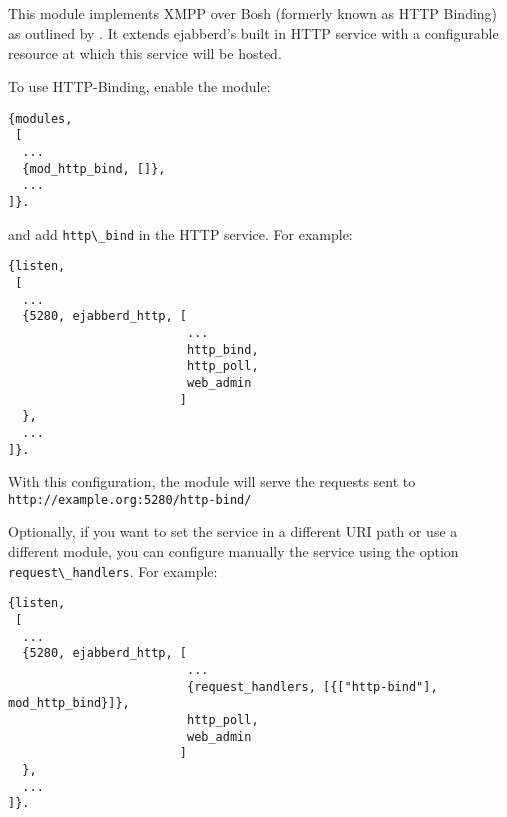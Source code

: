 \subsection{\modhttpbind{}}
\label{modhttpbind}

This module implements XMPP over Bosh (formerly known as HTTP Binding)
as outlined by .
It extends ejabberd's built in HTTP service with a configurable
resource at which this service will be hosted.

To use HTTP-Binding, enable the module:
\begin{verbatim}
{modules,
 [
  ...
  {mod_http_bind, []},
  ...
]}.
\end{verbatim}
and add \verb|http\_bind| in the HTTP service. For example:
\begin{verbatim}
{listen, 
 [
  ...
  {5280, ejabberd_http, [
                         ...
                         http_bind,
                         http_poll,
                         web_admin
                        ]
  },
  ...
]}.
\end{verbatim}
With this configuration, the module will serve the requests sent to 
\verb|http://example.org:5280/http-bind/|

Optionally, if you want to set the service in a different URI path or use a different module, 
you can configure manually the service using the option \verb|request\_handlers|. 
For example:
\begin{verbatim}
{listen, 
 [
  ...
  {5280, ejabberd_http, [
                         ...
                         {request_handlers, [{["http-bind"], mod_http_bind}]},
                         http_poll,
                         web_admin
                        ]
  },
  ...
]}.
\end{verbatim}
